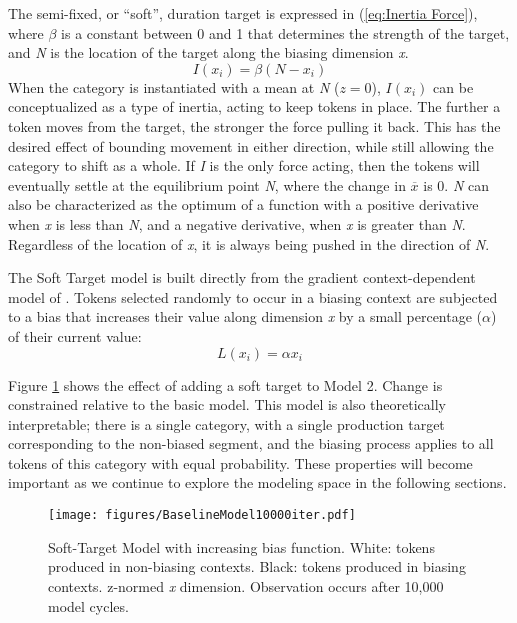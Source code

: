 The semi-fixed, or “soft”, duration target is expressed in (\ref{eq:Inertia Force}),
where $\beta$ is a constant between 0 and 1 that determines the strength
of the target, and \emph{N} is the location of the target along the
biasing dimension \emph{x}.
\begin{equation}
I(x_{i})=\beta(N-x_{i})\label{eq:Inertia Force}
\end{equation}
When the category is instantiated with a mean at \emph{N} ($z=0$),
$I(x_{i})$ can be conceptualized as a type of inertia, acting to keep
tokens in place. The further a token moves from the target, the stronger
the force pulling it back. This has the desired effect of bounding
movement in either direction, while still allowing the category to
shift as a whole. If \emph{I} is the only force acting, then the tokens
will eventually settle at the equilibrium point \emph{N}, where the
change in \emph{$\overline{x}$} is 0. \emph{N} can also be characterized
as the optimum of a function with a positive derivative when \emph{x}
is less than \emph{N}, and a negative derivative, when \emph{x} is
greater than \emph{N}. Regardless of the location of \emph{x}, it
is always being pushed in the direction of \emph{N}. 

The Soft Target model is built directly from the gradient context-dependent
model of . Tokens selected
randomly to occur in a biasing context are subjected to a bias that
increases their value along dimension \emph{x} by a small percentage
($\alpha$) of their current value: 
\begin{equation}
L(x_{i})=\alpha x_{i}\label{eq:Lengthening Force}
\end{equation}

Figure \ref{fig:Model2:LengtheningProcess} shows the effect of adding
a soft target to Model 2. Change is constrained relative to the basic
model. This model is also theoretically interpretable; there is a
single category, with a single production target corresponding to
the non-biased segment, and the biasing process applies to all tokens
of this category with equal probability. These properties will become
important as we continue to explore the modeling space in the following
sections. 

\begin{figure}[H]
\centering{}\texttt{[image: figures/BaselineModel10000iter.pdf]}\caption{\label{fig:Model2:LengtheningProcess}Soft-Target Model with increasing
bias function. White: tokens produced
in non-biasing contexts. Black: tokens produced in biasing contexts.
z-normed \emph{x} dimension. Observation occurs after 10,000
model cycles.}
\end{figure}

